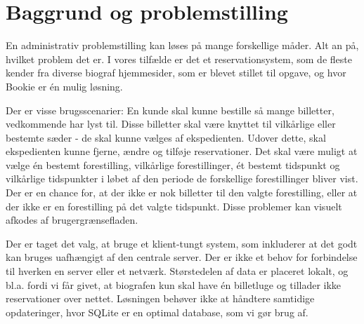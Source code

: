 \chapter{Baggrund og problemstilling}

En administrativ problemstilling kan løses på mange forskellige måder. Alt an på, hvilket problem det er. I vores tilfælde er det et reservationsystem, som de fleste kender fra diverse biograf hjemmesider, som er blevet stillet til opgave, og hvor Bookie er én mulig løsning.

Der er visse brugsscenarier: En kunde skal kunne bestille så mange billetter, vedkommende har lyst til. Disse billetter skal være knyttet til vilkårlige eller bestemte sæder - de skal kunne vælges af ekspedienten. Udover dette, skal ekspedienten kunne fjerne, ændre og tilføje reservationer. Det skal være muligt at vælge én bestemt forestilling, vilkårlige forestillinger, ét bestemt tidspunkt og vilkårlige tidspunkter i løbet af den periode de forskellige forestillinger bliver vist.
Der er en chance for, at der ikke er nok billetter til den valgte forestilling, eller at der ikke er en forestilling på det valgte tidspunkt. Disse problemer kan visuelt afkodes af brugergrænsefladen.

Der er taget det valg, at bruge et klient-tungt system, som inkluderer at det godt kan bruges uafhængigt af den centrale server. Der er ikke et behov for forbindelse til hverken en server eller et netværk. Størstedelen af data er placeret lokalt, og  bl.a. fordi vi får givet, at biografen kun skal have én billetluge og tillader ikke reservationer over nettet. Løsningen behøver ikke at håndtere samtidige opdateringer, hvor SQLite er en optimal database, som vi gør brug af.



